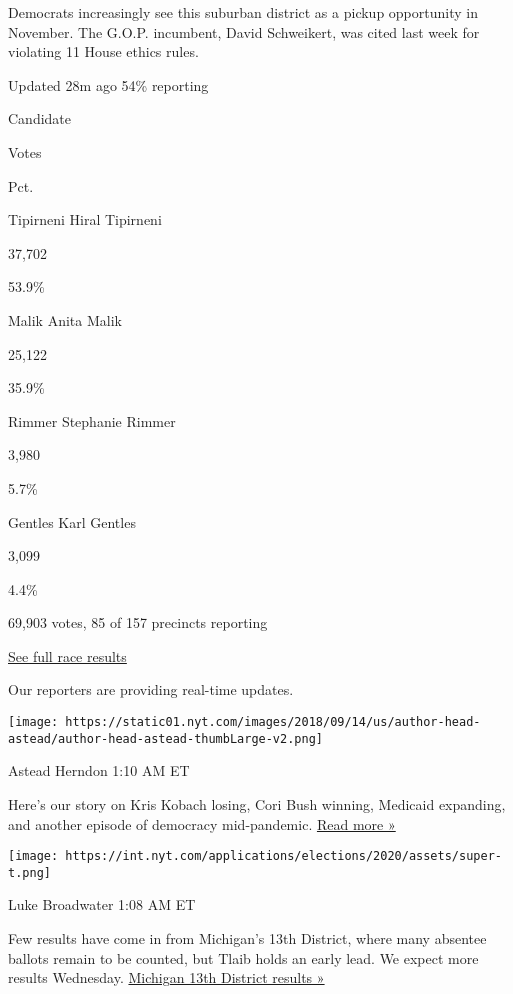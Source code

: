 Democrats increasingly see this suburban district as a pickup
opportunity in November. The G.O.P. incumbent, David Schweikert, was
cited last week for violating 11 House ethics rules.

Updated 28m ago 54\% reporting

Candidate

Votes

Pct.

 Tipirneni Hiral Tipirneni

37,702

53.9\%

 Malik Anita Malik

25,122

35.9\%

 Rimmer Stephanie Rimmer

3,980

5.7\%

 Gentles Karl Gentles

3,099

4.4\%

69,903 votes, 85 of 157 precincts reporting

\href{https://www.nytimes.com/interactive/2020/08/04/us/elections/results-arizona-house-district-6-primary-election.html}{See
full race results}

Our reporters are providing real-time updates.

\texttt{[image: https://static01.nyt.com/images/2018/09/14/us/author-head-astead/author-head-astead-thumbLarge-v2.png]}

Astead Herndon 1:10 AM ET

Here's our story on Kris Kobach losing, Cori Bush winning, Medicaid
expanding, and another episode of democracy mid-pandemic.
\href{https://www.nytimes.com/2020/08/04/us/politics/kobach-tlaib.html?action=click\&module=ELEX_results\&pgtype=Interactive\&region=ReporterUpdates}{Read
more »}

\texttt{[image: https://int.nyt.com/applications/elections/2020/assets/super-t.png]}

Luke Broadwater 1:08 AM ET

Few results have come in from Michigan's 13th District, where many
absentee ballots remain to be counted, but Tlaib holds an early lead. We
expect more results Wednesday.
\href{https://www.nytimes.com/interactive/2020/08/04/us/elections/results-michigan-house-district-13-primary-election.html?action=click\&module=ELEX_results\&pgtype=Interactive\&region=ReporterUpdates}{Michigan
13th District results »}

